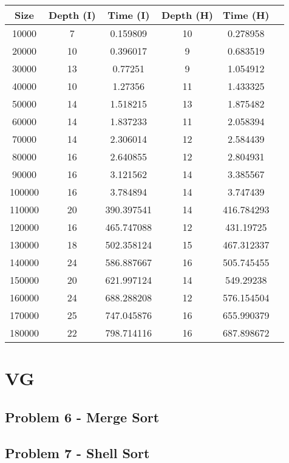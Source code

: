 \documentclass[12pt]{article}
\begin{document}
\begin{table}[h]
    \centering
    \begin{tabular}{|c|c|c|c|c|c|}
        \hline
        \textbf{Size} & \textbf{Depth (I)} & \textbf{Time (I)} & \textbf{Depth (H)} & \textbf{Time (H)} \\
        \hline 10000 & 7 & 0.159809  &  10 & 0.278958 \\
        \hline 20000 & 10 & 0.396017 &  9 & 0.683519 \\
        \hline 30000 & 13 & 0.77251  &  9 & 1.054912 \\
        \hline 40000 & 10 & 1.27356  &  11 & 1.433325 \\
        \hline 50000 & 14 & 1.518215  & 13 & 1.875482 \\
        \hline 60000 & 14 & 1.837233  & 11 & 2.058394 \\
        \hline 70000 & 14 & 2.306014  & 12 & 2.584439 \\
        \hline 80000 & 16 & 2.640855  & 12 & 2.804931 \\
        \hline 90000 & 16 & 3.121562  & 14 & 3.385567 \\
        \hline 100000 & 16 & 3.784894 & 14 & 3.747439 \\
        \hline 110000 & 20 & 390.397541 & 14 & 416.784293 \\
        \hline 120000 & 16 & 465.747088 & 12 & 431.19725 \\
        \hline 130000 & 18 & 502.358124 & 15 & 467.312337 \\
        \hline 140000 & 24 & 586.887667 & 16 & 505.745455 \\
        \hline 150000 & 20 & 621.997124 & 14 & 549.29238 \\
        \hline 160000 & 24 & 688.288208 & 12 & 576.154504 \\
        \hline 170000 & 25 & 747.045876 & 16 & 655.990379 \\
        \hline 180000 & 22 & 798.714116 & 16 & 687.898672 \\
        \hline
    \end{tabular}
\end{table}


\section{VG}

\subsection{Problem 6 - Merge Sort}
\subsection{Problem 7 - Shell Sort}
\end{document}
